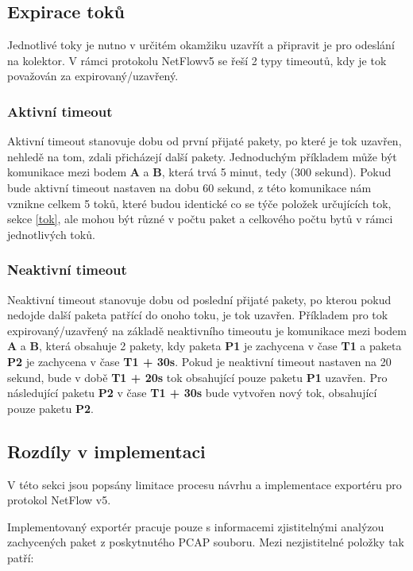 \documentclass[11pt, a4paper, hidelinks]{article}[08.10.2023]
\begin{document}
    \subsection{Expirace toků}\label{timeout}
    Jednotlivé toky je nutno v určitém okamžiku uzavřít a připravit je pro odeslání na kolektor.  V rámci protokolu NetFlowv5 se řeší 2 typy timeoutů, kdy je tok považován za expirovaný/uzavřený.

    \subsubsection{Aktivní timeout}
    Aktivní timeout stanovuje dobu od první přijaté pakety, po které je tok uzavřen, nehledě na tom, zdali přicházejí další pakety. Jednoduchým příkladem může být komunikace mezi bodem \textbf{A} a \textbf{B}, která trvá 5 minut, tedy (300 sekund). Pokud bude aktivní timeout nastaven na dobu 60 sekund, z této komunikace nám vznikne celkem 5 toků, které budou identické co se týče položek určujících tok, sekce \ref{tok}, ale mohou být různé v počtu paket a celkového počtu bytů v rámci jednotlivých toků.

    \subsubsection{Neaktivní timeout}
    Neaktivní timeout stanovuje dobu od poslední přijaté pakety, po kterou pokud nedojde další paketa patřící do onoho toku, je tok uzavřen. Příkladem pro tok expirovaný/uzavřený na základě neaktivního timeoutu je komunikace mezi bodem \textbf{A} a \textbf{B}, která obsahuje 2 pakety, kdy paketa \textbf{P1} je zachycena v čase \textbf{T1} a paketa \textbf{P2} je zachycena v čase \textbf{T1 + 30s}. Pokud je neaktivní timeout nastaven na 20 sekund, bude v době \textbf{T1 + 20s} tok obsahující pouze paketu \textbf{P1} uzavřen. Pro následující paketu \textbf{P2} v čase \textbf{T1 + 30s} bude vytvořen nový tok, obsahující pouze paketu \textbf{P2}.
    
    \subsection{Rozdíly v implementaci}\label{limitace}
    V této sekci jsou popsány limitace procesu návrhu a implementace exportéru pro protokol NetFlow v5. 
    
    Implementovaný exportér pracuje pouze s informacemi zjistitelnými analýzou zachycených paket z poskytnutého PCAP souboru.
    Mezi nezjistitelné položky tak patří:
\end{document}
